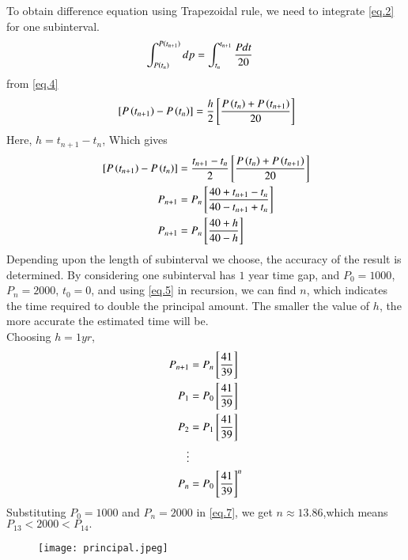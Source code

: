 \documentclass[journal,12pt,onecolumn]{IEEEtran}
\theoremstyle{remark}
\begin{document}
To obtain difference equation using Trapezoidal rule, we need to integrate \ref{eq.2} for one subinterval.
\begin{align}
    \int_{P\left(t_n\right)}^{P\left(t_{n+1}\right)} dp &= \int_{t_n}^{t_{n+1}} \frac{Pdt}{20}
\end{align}
from \ref{eq.4}
\begin{align}
     {}\left[ P\left(t_{n+1}\right) -P\left(t_n\right)\right]=\frac{h}{2}{}\left[\frac{P\left(t_n\right)+P\left(t_{n+1}\right)}{20}\right]
\end{align}
Here, $h=t_{n+1}-t_n$, Which gives
\begin{align}
   {}\left[ P\left(t_{n+1}\right) -P\left(t_n\right)\right]&=\frac{t_{n+1}-t_n}{2}{}\left[\frac{P\left(t_n\right)+P\left(t_{n+1}\right)}{20}\right] \\ 
   P_{n+1}&=P_n{}\left[\frac{40+t_{n+1}-t_n}{40-t_{n+1}+t_n}\right] \label{eq.5} \\
   P_{n+1}&=P_n{}\left[\frac{40+h}{40-h} \right]\label{eq.6}
\end{align}
Depending upon the length of subinterval we choose, the accuracy of the result is determined.
By considering one subinterval has $1$ year time gap, and $P_0=1000$, $P_n=2000$, $t_0=0$, and using \ref{eq.5} in recursion, we can find $n$, which indicates the time required to double the principal amount. The smaller the value of $h$, the more accurate the estimated time will be.\\
Choosing $h=1yr$,
\begin{align}
    P_{n+1}&=P_n{}\left[\frac{41}{39} \right]\\
    P_{1}&=P_0{}\left[\frac{41}{39} \right]\\
    P_{2}&=P_1{}\left[\frac{41}{39} \right]\\
    \vdots \\
    P_{n}&=P_0{}\left[\frac{41}{39} \right]^{n} \label{eq.7}
\end{align}
Substituting $P_0=1000$ and $P_n=2000$ in \ref{eq.7}, we get $n\approx 13.86$,which means $P_{13}<2000<P_{14}.$

\begin{figure}[h!]
    \centering
    \texttt{[image: principal.jpeg]} 
\end{figure}

   
\end{document}
